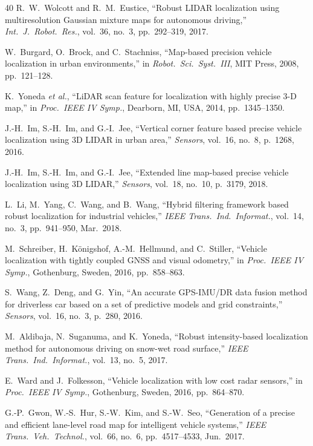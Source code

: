 \documentclass[lettersize,journal]{IEEEtran}
\begin{document}
\begin{thebibliography}{40}
R.~W.~Wolcott and R.~M.~Eustice,
``Robust {LIDAR} localization using multiresolution {Gaussian} mixture
maps for autonomous driving,''
\textit{Int.\ J.\ Robot.\ Res.}, vol.~36, no.~3, pp.~292--319, 2017.

W.~Burgard, O.~Brock, and C.~Stachniss,
``Map-based precision vehicle localization in urban environments,''
in \textit{Robot.\ Sci.\ Syst.\ III}, MIT Press, 2008, pp.~121--128.

K.~Yoneda \textit{et al.},
``{LiDAR} scan feature for localization with highly precise 3-D map,''
in \textit{Proc.\ IEEE IV Symp.}, Dearborn, MI, USA, 2014,
pp.~1345--1350.

J.-H.~Im, S.-H.~Im, and G.-I.~Jee,
``Vertical corner feature based precise vehicle localization using 3D
{LIDAR} in urban area,''
\textit{Sensors}, vol.~16, no.~8, p.~1268, 2016.

J.-H.~Im, S.-H.~Im, and G.-I.~Jee,
``Extended line map-based precise vehicle localization using 3D {LIDAR},''
\textit{Sensors}, vol.~18, no.~10, p.~3179, 2018.

L.~Li, M.~Yang, C.~Wang, and B.~Wang,
``Hybrid filtering framework based robust localization for industrial
vehicles,''
\textit{IEEE Trans.\ Ind.\ Informat.}, vol.~14, no.~3, pp.~941--950,
Mar.\ 2018.

M.~Schreiber, H.~K\"{o}nigshof, A.-M.~Hellmund, and C.~Stiller,
``Vehicle localization with tightly coupled {GNSS} and visual odometry,''
in \textit{Proc.\ IEEE IV Symp.}, Gothenburg, Sweden, 2016,
pp.~858--863.

S.~Wang, Z.~Deng, and G.~Yin,
``An accurate {GPS-IMU/DR} data fusion method for driverless car based
on a set of predictive models and grid constraints,''
\textit{Sensors}, vol.~16, no.~3, p.~280, 2016.

M.~Aldibaja, N.~Suganuma, and K.~Yoneda,
``Robust intensity-based localization method for autonomous driving on
snow-wet road surface,''
\textit{IEEE Trans.\ Ind.\ Informat.}, vol.~13, no.~5, 2017.

E.~Ward and J.~Folkesson,
``Vehicle localization with low cost radar sensors,''
in \textit{Proc.\ IEEE IV Symp.}, Gothenburg, Sweden, 2016,
pp.~864--870.

G.-P.~Gwon, W.-S.~Hur, S.-W.~Kim, and S.-W.~Seo,
``Generation of a precise and efficient lane-level road map for
intelligent vehicle systems,''
\textit{IEEE Trans.\ Veh.\ Technol.}, vol.~66, no.~6,
pp.~4517--4533, Jun.\ 2017.


\end{thebibliography}
\end{document}
